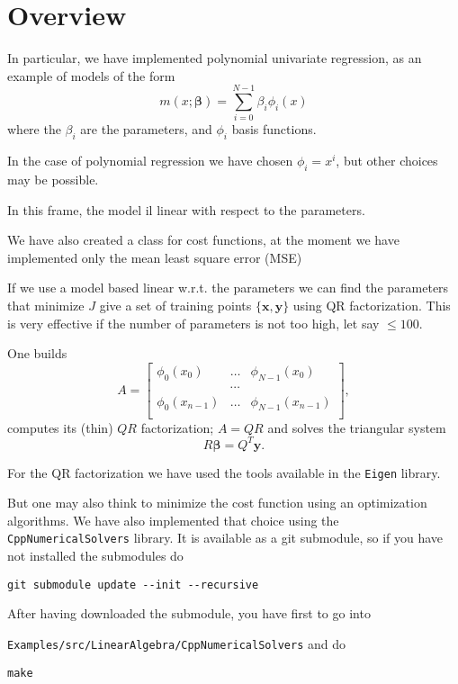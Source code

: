 \documentclass{article}
\begin{document}
 \section{Overview}
In particular, we have implemented polynomial univariate regression, as an example of models of the form
\begin{equation}
m(x;\boldsymbol{\beta})=\sum_{i=0}^{N-1} \beta_i\phi_i(x)
\end{equation}
where the $\beta_i$ are the parameters, and $\phi_i$ basis functions.

In the case of polynomial regression we have chosen $\phi_i=x^i$, but other choices may be possible.

In this frame, the model il linear with respect to the parameters.

We have also created a class for cost functions, at the moment we have implemented only the mean least square error (MSE)

If we use a model based linear w.r.t. the parameters we can find the parameters that minimize $J$ give a set of training points $\{\mathbf{x},\mathbf{y}\}$
using QR factorization. This is very effective if the number of parameters is not too high, let say $\le 100$.

One builds
\[
A=\begin{bmatrix}
\phi_0(x_0)&\ldots&\phi_{N-1}(x_{0})\\
&\cdots &\\
\phi_0(x_{n-1})&\ldots&\phi_{N-1}(x_{n-1})\\
\end{bmatrix},
\]
computes its (thin) $QR$ factorization; $A=QR$ and solves the triangular system
\[
R\boldsymbol{\beta}=Q^T\mathbf{y}.
\]

For the QR factorization we have used the tools available in the \texttt{Eigen} library.

But one may also think to minimize the cost function using an optimization algorithms.
We have also implemented that choice using the \texttt{CppNumericalSolvers} library. It is available as a git submodule, so if you have not installed the submodules
do
\begin{verbatim}
git submodule update --init --recursive
\end{verbatim}

After having downloaded the submodule, you have first to go into

\texttt{Examples/src/LinearAlgebra/CppNumericalSolvers} and do
\begin{verbatim}
make
\end{verbatim}
\end{document}
